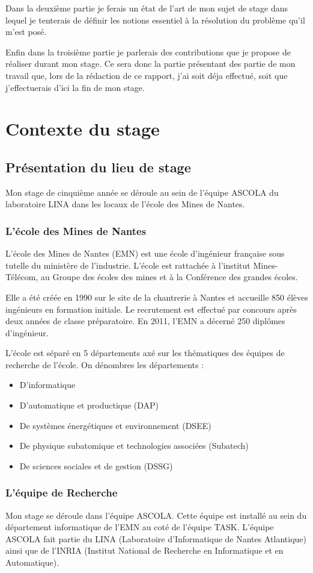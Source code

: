 \documentclass[a4paper, 11pt]{report}
\begin{document}
Dans la deuxième partie je ferais un état de l'art de mon sujet de stage dans lequel je tenterais de définir les notions essentiel à la résolution du problème qu'il m'est posé.

Enfin dans la troisième partie je parlerais des contributions que je propose de réaliser durant mon stage. Ce sera donc la partie présentant des partie de mon travail que, lors de la rédaction de ce rapport, j'ai soit déja effectué, soit que j'effectuerais d'ici la fin de mon stage.

\chapter{Contexte du stage}
\section{Présentation du lieu de stage}
Mon stage de cinquième année se déroule au sein de l’équipe ASCOLA du laboratoire LINA dans les locaux de l’école des Mines de Nantes.
\subsection{L'école des Mines de Nantes}
L’école des Mines de Nantes (EMN) est une école d’ingénieur française sous tutelle du ministère de l’industrie. L’école est rattachée à l’institut Mines-Télécom, au Groupe des écoles des mines et à la Conférence des grandes écoles.

Elle a été créée en 1990 sur le site de la chantrerie à Nantes et accueille 850 élèves ingénieurs en formation initiale. Le recrutement est effectué par concours après deux années de classe préparatoire. En 2011, l’EMN a décerné 250 diplômes d’ingénieur.

L’école est séparé en 5 départements axé sur les thématiques des équipes de recherche de l'école. On dénombres les départements :
\begin{itemize}
	\item D'informatique
	\item D'automatique et productique (DAP)
	\item De systèmes énergétiques et environnement (DSEE)
	\item De physique subatomique et technologies associées (Subatech)
	\item De sciences sociales et de gestion (DSSG)
\end{itemize}

\subsection{L'équipe de Recherche}
Mon stage se déroule dans l'équipe ASCOLA. Cette équipe est installé au sein du département informatique de l’EMN au coté de l'équipe TASK. L'équipe ASCOLA fait partie du LINA (Laboratoire d'Informatique de Nantes Atlantique) ainsi que de l'INRIA (Institut National de Recherche en Informatique et en Automatique).
\end{document}
